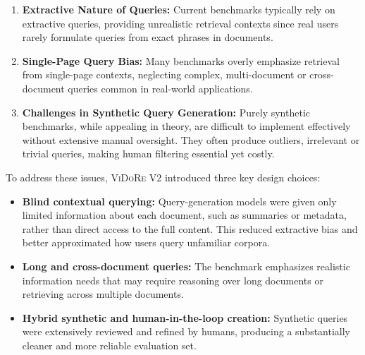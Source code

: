 \begin{sagekaobox}[frametitle=Paper Context]
\begin{enumerate}
  \item \textbf{Extractive Nature of Queries:} Current benchmarks typically rely on extractive queries, providing unrealistic retrieval contexts since real users rarely formulate queries from exact phrases in documents.
  \item \textbf{Single-Page Query Bias:} Many benchmarks overly emphasize retrieval from single-page contexts, neglecting complex, multi-document or cross-document queries common in real-world applications.
  \item \textbf{Challenges in Synthetic Query Generation:} Purely synthetic benchmarks, while appealing in theory, are difficult to implement effectively without extensive manual oversight. They often produce outliers, irrelevant or trivial queries, making human filtering essential yet costly.
\end{enumerate}
To address these issues, \textsc{ViDoRe} V2 introduced three key design choices:

\begin{itemize}
  \item \textbf{Blind contextual querying:} Query-generation models were given only limited information about each document, such as summaries or metadata, rather than direct access to the full content. This reduced extractive bias and better approximated how users query unfamiliar corpora.
  \item \textbf{Long and cross-document queries:} The benchmark emphasizes realistic information needs that may require reasoning over long documents or retrieving across multiple documents.
  \item \textbf{Hybrid synthetic and human-in-the-loop creation:} Synthetic queries were extensively reviewed and refined by humans, producing a substantially cleaner and more reliable evaluation set.
\end{itemize}


\end{sagekaobox}
